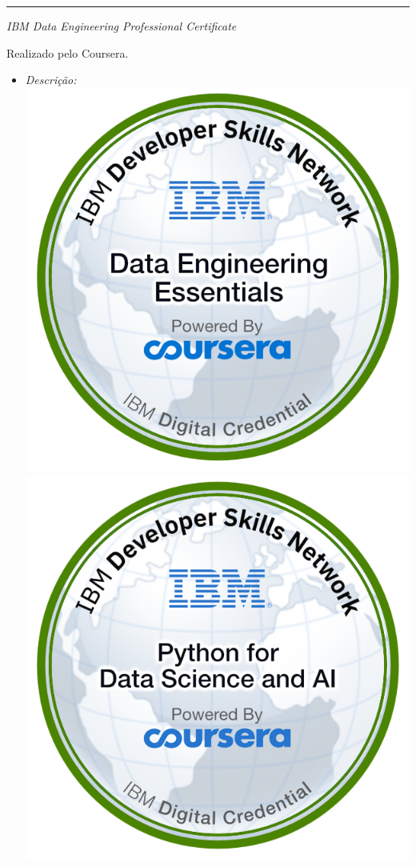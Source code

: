 \documentclass[a4paper,10pt]{article}
\newlength{\cvcolumngapwidth}
\newlength{\cvleftcolumnwidth}
\newlength{\cvrightcolumnwidth}
\newcommand{\cvsectionstyle}[1]{{\normalsize\cvsectionfont\textcolor{cvsectioncolor}{#1}}}
\newcommand{\cvtitlestyle}[1]{{\normalsize\cvtitlefont\textcolor{cvtitlecolor}{#1}}}
\newcommand{\cvdurationstyle}[1]{{\normalsize\cvdurationfont\textcolor{cvdurationcolor}{#1}}}
\newlength{\cvafteritemskipamount}
\newlength{\cvaftersectionskipamount}
\newlength{\cvaftertitleskipamount}
\newlength{\cvparskip}
\newcommand{\cvsection}[1]{
    \begin{minipage}[t]{\cvleftcolumnwidth}
        \raggedleft\cvsectionstyle{#1}
    \end{minipage}%
    \hspace{\cvcolumngapwidth}%
    \begin{minipage}[t]{\cvrightcolumnwidth}
        \textcolor{cvrulecolor}{\rule{\cvrightcolumnwidth}{0.5mm}}
    \end{minipage}
    \vspace{\cvaftersectionskipamount}}
\newcommand{\cvitem}[2]{
    \begin{minipage}[t]{\cvleftcolumnwidth}
        \raggedleft #1
    \end{minipage}%
    \hspace{\cvcolumngapwidth}%
    \begin{minipage}[t]{\cvrightcolumnwidth}
        \setlength{\parskip}{\cvparskip} #2
    \end{minipage}
    \vspace{\cvafteritemskipamount}}
\newcommand{\cvtitle}[1]{
    \cvtitlestyle{#1}
    \vspace{\cvaftertitleskipamount}
    \vspace{-\cvparskip}}
\begin{document}
\cvsection{Formação Complementar}
\cvitem{\cvdurationstyle{2021 - Em andamento}}
    {\cvtitle{\textit{IBM Data Engineering Professional Certificate}}

    Realizado pelo Coursera.
    
        \begin{itemize}[leftmargin=*]
        \item \textit{Descrição:}   \includegraphics[clip,scale=0.08]{data-engineering-essentials.png} 
                                    \includegraphics[clip,scale=0.08]{python-for-data-science-and-ai.png}        

\end{itemize}}
\end{document}
